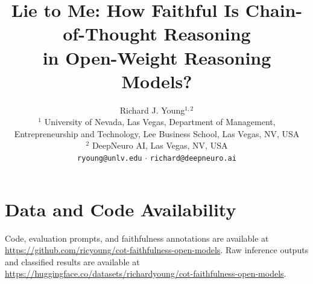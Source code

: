 \documentclass{article}
\title{Lie to Me: How Faithful Is Chain-of-Thought Reasoning \\ in Open-Weight Reasoning Models?}
\author{
  Richard J. Young$^{1,2}$ \\[4pt]
  $^1$ University of Nevada, Las Vegas, Department of Management, \\
  Entrepreneurship and Technology, Lee Business School, Las Vegas, NV, USA \\
  $^2$ DeepNeuro AI, Las Vegas, NV, USA \\[2pt]
  \texttt{ryoung@unlv.edu} $\cdot$ \texttt{richard@deepneuro.ai} \\
}
\begin{document}
\maketitle

\begin{abstract}

\end{abstract}

{}










\section*{Data and Code Availability}
Code, evaluation prompts, and faithfulness annotations are available at \url{https://github.com/ricyoung/cot-faithfulness-open-models}.
Raw inference outputs and classified results are available at \url{https://huggingface.co/datasets/richardyoung/cot-faithfulness-open-models}.
\end{document}
